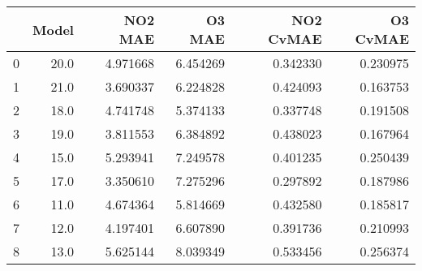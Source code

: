 \begin{tabular}{lrrrrr}
\toprule
{} &  Model &   NO2 MAE &    O3 MAE &  NO2 CvMAE &  O3 CvMAE \\
\midrule
0 &   20.0 &  4.971668 &  6.454269 &   0.342330 &  0.230975 \\
1 &   21.0 &  3.690337 &  6.224828 &   0.424093 &  0.163753 \\
2 &   18.0 &  4.741748 &  5.374133 &   0.337748 &  0.191508 \\
3 &   19.0 &  3.811553 &  6.384892 &   0.438023 &  0.167964 \\
4 &   15.0 &  5.293941 &  7.249578 &   0.401235 &  0.250439 \\
5 &   17.0 &  3.350610 &  7.275296 &   0.297892 &  0.187986 \\
6 &   11.0 &  4.674364 &  5.814669 &   0.432580 &  0.185817 \\
7 &   12.0 &  4.197401 &  6.607890 &   0.391736 &  0.210993 \\
8 &   13.0 &  5.625144 &  8.039349 &   0.533456 &  0.256374 \\
\bottomrule
\end{tabular}
